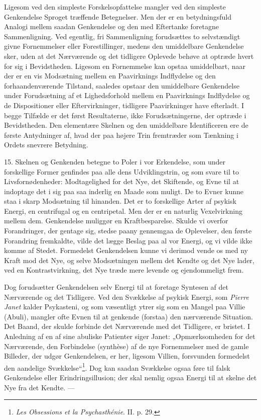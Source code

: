 \documentclass[12pt,a4paper]{book}
\newcommand{\apage}[1]{\marginnote{\footnotesize\textit{[#1]}}}
\begin{document}
Ligesom ved den simpleste Forskelsopfattelse mangler ved den simpleste
Genkendelse Sproget træffende Betegnelser. Men der er en betydningsfuld
Analogi mellem saadan Genkendelse og den med Eftertanke foretagne
Sammenligning. Ved egentlig, fri Sammenligning forudsættes to
selvstændigt givne Fornemmelser eller Forestillinger, medens den
umiddelbare Genkendelse sker, uden at det Nærværende og det tidligere
Oplevede behøve at optræde hvert for sig i Bevidstheden. Ligesom en
Fornemmelse kan opstaa umiddelbart, naar der er en vis Modsætning mellem
en Paavirknings Indflydelse og den forhaandenværende Tilstand, saaledes
opstaar den umiddelbare Genkendelse under Forudsætning af et
Lighedsforhold mellem en Paavirknings Indflydelse og de Dispositioner
eller Eftervirkninger, tidligere Paavirkninger have efterladt. I begge
Tilfælde er det først Resultaterne, ikke Forudsætningerne, \apage{49} der optræde i
Bevidstheden. Den elementære Skelnen og den umiddelbare Identificeren ere
de første Antydninger af, hvad der paa højere Trin fremtræder som
Tænkning i Ordets snevrere Betydning.

15. Skelnen og Genkenden betegne to Poler i vor Erkendelse, som under
forskellige Former genfindes paa alle dens Udviklingstrin, og som svare
til to Livsfornødenheder: Modtagelighed for det Nye, det Skiftende, og
Evne til at indoptage det i sig paa saa inderlig en Maade som muligt. De
to Evner kunne staa i skarp Modsætning til hinanden. Det er to
forskellige Arter af psykisk Energi, en centrifugal og en centripetal.
Men der er en naturlig Vexelvirkning mellem dem. Genkendelse muliggør en
Kraftbesparelse. Skulde vi overfor Forandringer, der gentage sig, stedse
paany gennemgaa de Oplevelser, den første Forandring fremkaldte, vilde
det lægge Beslag paa al vor Energi, og vi vilde ikke komme af Stedet.
Formedelst Genkendelsen kunne vi derimod vende os med ny Kraft mod det
Nye, og selve Modsætningen mellem det Kendte og det Nye lader, ved en
Kontrastvirkning, det Nye træde mere levende og ejendommeligt frem.

Dog forudsætter Genkendelsen selv Energi til at foretage Syntesen af det
Nærværende og det Tidligere. Ved den Svækkelse af psykisk Energi, som
\emph{Pierre Janet} kalder Psykasteni, og som væsentligt ytrer sig som en
Mangel paa Villie (Abuli), mangler ofte Evnen til at genkende (forstaa)
den nærværende Situation. Det Baand, der skulde forbinde det Nærværende
med det Tidligere, er bristet. I Anledning af en af sine abuliske
Patienter siger Janet: „Opmærksomheden for det Nærværende, den
Forbindelse (synthèse) af de nye Fornemmelser med de gamle Billeder, der
udgør Genkendelsen, er her, ligesom Villien, forsvunden formedelst den
aandelige Svækkelse“\footnote{\emph{Les Obsessions et la Psychasthénie}.
II. p. 29.}. Dog kan saadan Svækkelse ogsaa føre til falsk Genkendelse
eller Erindringsillusion; der skal nemlig ogsaa Energi til at skelne det
Nye fra det Kendte. ---
\end{document}
